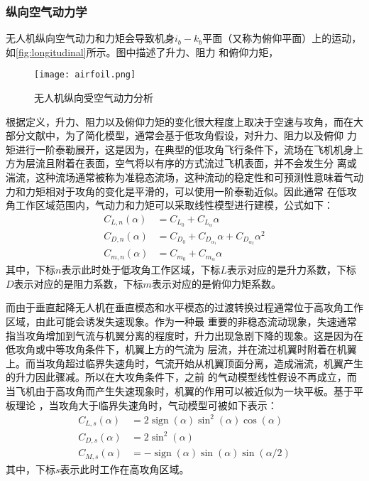 \subsubsection{纵向空气动力学}
无人机纵向空气动力和力矩会导致机身$i_{b}-k_{b}$平面（又称为俯仰平面）上的运动，如\autoref{fig:longitudinal}所示。图中描述了升力、阻力
和俯仰力矩，
\begin{figure}[htbp]
    \centering
    \texttt{[image: airfoil.png]}
    \caption{\label{fig:longitudinal}无人机纵向受空气动力分析}
\end{figure}
根据定义，升力、阻力以及俯仰力矩的变化很大程度上取决于空速与攻角，而在大部分文献中，为了简化模型，通常会基于低攻角假设，对升力、阻力以及俯仰
力矩进行一阶泰勒展开，这是因为，在典型的低攻角飞行条件下，流场在飞机机身上方为层流且附着在表面，空气将以有序的方式流过飞机表面，并不会发生分
离或湍流，这种流场通常被称为准稳态流场，这种流动的稳定性和可预测性意味着气动力和力矩相对于攻角的变化是平滑的，可以使用一阶泰勒近似。因此通常
在低攻角工作区域范围内，气动力和力矩可以采取线性模型进行建模\cite{kikumoto2022back}，公式如下：
\begin{align}
    C_{L,n}(\alpha) &= C_{L_{0}}+C_{L_{\alpha}} \alpha \\
    C_{D,n}(\alpha) &=C_{D_{0}}+C_{D_{\alpha_{1}}} \alpha+C_{D_{\alpha_{2}}} \alpha^{2} \\
    C_{m,n}(\alpha) &= C_{m_{0}}+C_{m_{\alpha}} \alpha
\end{align}
其中，下标$n$表示此时处于低攻角工作区域，下标$L$表示对应的是升力系数，下标$D$表示对应的是阻力系数，下标$m$表示对应的是俯仰力矩系数。

而由于垂直起降无人机在垂直模态和水平模态的过渡转换过程通常位于高攻角工作区域\cite{argyle2016modeling}，由此可能会诱发失速现象。作为一种最
重要的非稳态流动现象，失速通常指当攻角增加到气流与机翼分离的程度时，升力出现急剧下降的现象。这是因为在低攻角或中等攻角条件下，机翼上方的气流为
层流，并在流过机翼时附着在机翼上。而当攻角超过临界失速角时，气流开始从机翼顶面分离，造成湍流，机翼产生的升力因此骤减。所以在大攻角条件下，之前
的气动模型线性假设不再成立，而当飞机由于高攻角而产生失速现象时，机翼的作用可以被近似为一块平板\cite{stengel2005flight}。基于平板理论
\cite{kikumoto2022back,stengel2005flight,puopolo2013comparison,beard2012small}，当攻角大于临界失速角时，气动模型可被如下表示：
\begin{align}
    C_{L,s}(\alpha) & =2 \operatorname{sign}(\alpha) \sin ^{2}(\alpha) \cos (\alpha) \\
    C_{D,s}(\alpha) & =2 \sin ^{2}(\alpha) \\
    C_{M,s}(\alpha) & =-\operatorname{sign}(\alpha) \sin (\alpha) \sin (\alpha / 2)
\end{align}
其中，下标$s$表示此时工作在高攻角区域。

